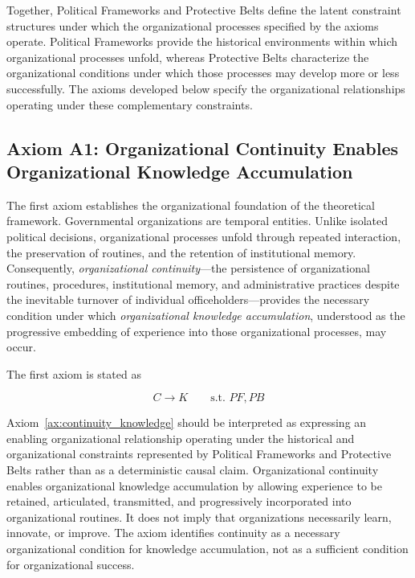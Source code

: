 \documentclass[doc, 12pt, a4paper,floatsintext]{apa7}
\begin{document}
Together, Political Frameworks and Protective Belts define the latent constraint structures under which the organizational processes specified by the axioms operate. Political Frameworks provide the historical environments within which organizational processes unfold, whereas Protective Belts characterize the organizational conditions under which those processes may develop more or less successfully. The axioms developed below specify the organizational relationships operating under these complementary constraints.
%
%
%
\subsection{Axiom A1: Organizational Continuity Enables Organizational Knowledge Accumulation}
%
The first axiom establishes the organizational foundation of the theoretical framework. Governmental organizations are temporal entities. Unlike isolated political decisions, organizational processes unfold through repeated interaction, the preservation of routines, and the retention of institutional memory. Consequently, \emph{organizational continuity}---the persistence of organizational routines, procedures, institutional memory, and administrative practices despite the inevitable turnover of individual officeholders---provides the necessary condition under which \emph{organizational knowledge accumulation}, understood as the progressive embedding of experience into those organizational processes, may occur.

The first axiom is stated as

\begin{equation}
\tag{A1}
C \rightarrow K
\qquad
\text{s.t. }PF,PB
\label{ax:continuity_knowledge}
\end{equation}

Axiom~\ref{ax:continuity_knowledge} should be interpreted as expressing an enabling organizational relationship operating under the historical and organizational constraints represented by Political Frameworks and Protective Belts rather than as a deterministic causal claim. Organizational continuity enables organizational knowledge accumulation by allowing experience to be retained, articulated, transmitted, and progressively incorporated into organizational routines. It does not imply that organizations necessarily learn, innovate, or improve. The axiom identifies continuity as a necessary organizational condition for knowledge accumulation, not as a sufficient condition for organizational success.
\end{document}
